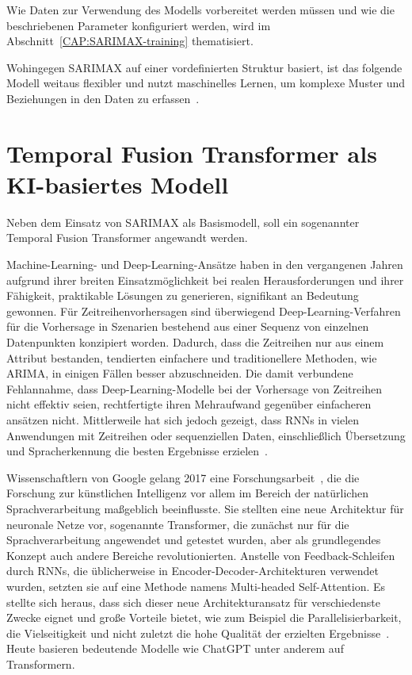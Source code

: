 Wie Daten zur Verwendung des Modells vorbereitet werden müssen und wie die beschriebenen Parameter konfiguriert werden, wird im Abschnitt~\ref{CAP:SARIMAX-training} thematisiert.

Wohingegen \ac{SARIMAX} auf einer vordefinierten Struktur basiert, ist das folgende Modell weitaus flexibler und nutzt maschinelles Lernen, um komplexe Muster und Beziehungen in den Daten zu erfassen~\cite{Lim.19.12.2019}.

\section{Temporal Fusion Transformer als KI-basiertes Modell}
Neben dem Einsatz von SARIMAX als Basismodell, soll ein sogenannter Temporal Fusion Transformer angewandt werden.

Machine-Learning- und Deep-Learning-Ansätze haben in den vergangenen Jahren aufgrund ihrer breiten Einsatzmöglichkeit bei realen Herausforderungen und ihrer Fähigkeit, praktikable Lösungen zu generieren, signifikant an Bedeutung gewonnen.
Für Zeitreihenvorhersagen sind überwiegend Deep-Learning-Verfahren für die Vorhersage in Szenarien bestehend aus einer Sequenz von einzelnen Datenpunkten konzipiert worden.
Dadurch, dass die Zeitreihen nur aus einem Attribut bestanden, tendierten einfachere und traditionellere Methoden, wie \ac{ARIMA}, in einigen Fällen besser abzuschneiden.
Die damit verbundene Fehlannahme, dass Deep-Learning-Modelle bei der Vorhersage von Zeitreihen nicht effektiv seien, rechtfertigte ihren Mehraufwand gegenüber einfacheren ansätzen nicht.
Mittlerweile hat sich jedoch gezeigt, dass \acp{RNN} in vielen Anwendungen mit Zeitreihen oder sequenziellen Daten, einschließlich Übersetzung und Spracherkennung die besten Ergebnisse erzielen~\cite{Lazzeri.2021}.

Wissenschaftlern von Google gelang 2017 eine Forschungsarbeit~\cite{Vaswani.2017}, die die Forschung zur künstlichen Intelligenz vor allem im Bereich der natürlichen Sprachverarbeitung maßgeblich beeinflusste.
Sie stellten eine neue Architektur für neuronale Netze vor, sogenannte Transformer, die zunächst nur für die Sprachverarbeitung angewendet und getestet wurden, aber als grundlegendes Konzept auch andere Bereiche revolutionierten.
Anstelle von Feedback-Schleifen durch \acp{RNN}, die üblicherweise in Encoder-Decoder-Architekturen verwendet wurden, setzten sie auf eine Methode namens \glqq Multi-headed Self-Attention\grqq{}.
Es stellte sich heraus, dass sich dieser neue Architekturansatz für verschiedenste Zwecke eignet und große Vorteile bietet, wie zum Beispiel die Parallelisierbarkeit, die Vielseitigkeit und nicht zuletzt die hohe Qualität der erzielten Ergebnisse~\cite{Vaswani.2017}.
Heute basieren bedeutende Modelle wie ChatGPT unter anderem auf Transformern.

